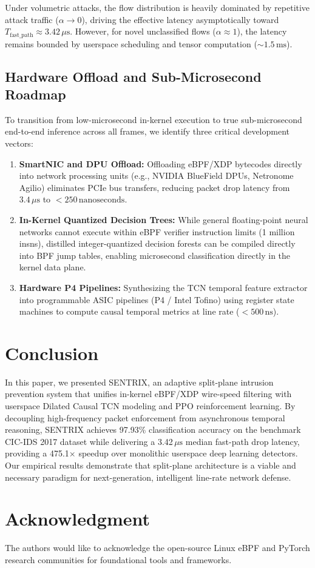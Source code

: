 \documentclass[conference,10pt]{IEEEtran}
\begin{document}
Under volumetric attacks, the flow distribution is heavily dominated by repetitive attack traffic ($\alpha \to 0$), driving the effective latency asymptotically toward $T_{\text{fast\_path}} \approx 3.42\,\mu\text{s}$. However, for novel unclassified flows ($\alpha \approx 1$), the latency remains bounded by userspace scheduling and tensor computation ($\sim 1.5\,\text{ms}$).

\subsection{Hardware Offload and Sub-Microsecond Roadmap}
To transition from low-microsecond in-kernel execution to true sub-microsecond end-to-end inference across all frames, we identify three critical development vectors:
\begin{enumerate}
    \item \textbf{SmartNIC and DPU Offload:} Offloading eBPF/XDP bytecodes directly into network processing units (e.g., NVIDIA BlueField DPUs, Netronome Agilio) eliminates PCIe bus transfers, reducing packet drop latency from $3.4\,\mu\text{s}$ to $< 250\,\text{nanoseconds}$.
    \item \textbf{In-Kernel Quantized Decision Trees:} While general floating-point neural networks cannot execute within eBPF verifier instruction limits (1 million insns), distilled integer-quantized decision forests can be compiled directly into BPF jump tables, enabling microsecond classification directly in the kernel data plane.
    \item \textbf{Hardware P4 Pipelines:} Synthesizing the TCN temporal feature extractor into programmable ASIC pipelines (P4 / Intel Tofino) using register state machines to compute causal temporal metrics at line rate ($< 500\,\text{ns}$).
\end{enumerate}

\section{Conclusion}
In this paper, we presented SENTRIX, an adaptive split-plane intrusion prevention system that unifies in-kernel eBPF/XDP wire-speed filtering with userspace Dilated Causal TCN modeling and PPO reinforcement learning. By decoupling high-frequency packet enforcement from asynchronous temporal reasoning, SENTRIX achieves 97.93\% classification accuracy on the benchmark CIC-IDS 2017 dataset while delivering a 3.42\,$\mu\text{s}$ median fast-path drop latency, providing a 475.1$\times$ speedup over monolithic userspace deep learning detectors. Our empirical results demonstrate that split-plane architecture is a viable and necessary paradigm for next-generation, intelligent line-rate network defense.

\section*{Acknowledgment}
The authors would like to acknowledge the open-source Linux eBPF and PyTorch research communities for foundational tools and frameworks.



\end{document}
